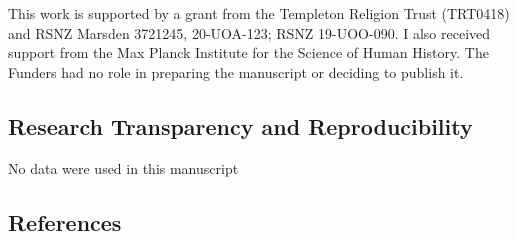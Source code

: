 \documentclass[
  single column]{article}
\begin{document}
This work is supported by a grant from the Templeton Religion Trust
(TRT0418) and RSNZ Marsden 3721245, 20-UOA-123; RSNZ 19-UOO-090. I also
received support from the Max Planck Institute for the Science of Human
History. The Funders had no role in preparing the manuscript or deciding
to publish it.

\subsection{Research Transparency and
Reproducibility}\label{research-transparency-and-reproducibility}

No data were used in this manuscript

\newpage{}

\subsection{References}\label{references}
\end{document}
